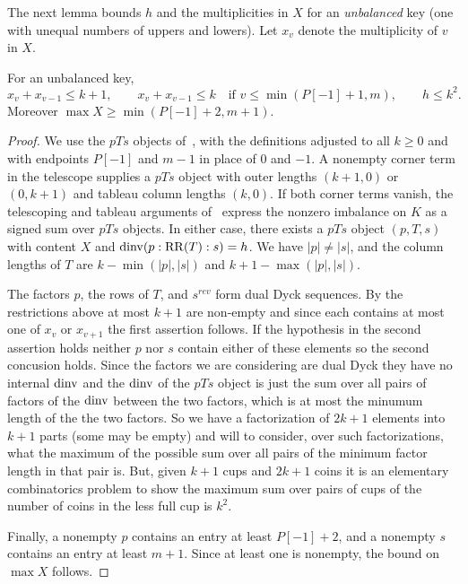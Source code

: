 \documentclass[11pt]{article}
\begin{document}
The next lemma bounds $h$ and the multiplicities in $X$ for an \emph{unbalanced} key (one with unequal numbers of uppers and lowers). Let $x_v$ denote the multiplicity of $v$ in $X$.
\begin{lemma}\label{bounds}
For an unbalanced key,
\[
x_v+x_{v-1}\le k+1,\qquad
 x_v+x_{v-1}\le k\quad\text{if }v\le\min(P[-1]+1,m), \qquad   h\le k^2.
\]
Moreover $\max X\ge\min(P[-1]+2,m+1)$.
\end{lemma}
\begin{proof}
We use the $pTs$ objects of~\cite[\S3.3]{H}, with the definitions adjusted to all $k\ge0$ and with endpoints $P[-1]$ and $m-1$ in place of $0$ and $-1$. A nonempty corner term in the telescope supplies a $pTs$ object with outer lengths $(k+1,0)$ or $(0,k+1)$ and tableau column lengths $(k,0)$. If both corner terms vanish, the telescoping and tableau arguments of~\cite[\S3.2, Lemma~3.4, and Corollary~3.5]{H} express the nonzero imbalance on $K$ as a signed sum over $pTs$ objects. In either case, there exists a $pTs$ object $(p,T,s)$ with content $X$ and $\operatorname{dinv}(p:\mathrm{RR}(T):s)=h$. We have $|p|\ne|s|$, and the column lengths of $T$ are $k-\min(|p|,|s|)$ and $k+1-\max(|p|,|s|)$.

The factors $p$, the rows of $T$, and $s^{rev}$ form dual Dyck sequences.  By the restrictions above at most $k+1$ are non-empty and since each contains at most one of $x_v$ or $x_{v+1}$ the first assertion follows. If the hypothesis in the second assertion holds neither $p$ nor $s$ contain either of these elements so the second concusion holds. Since the factors we are considering are dual Dyck they have no internal $\operatorname{dinv}$ and the $\operatorname{dinv}$ of the $pTs$ object is just the sum over all pairs of factors of the $\operatorname{dinv}$ between the two factors, which is at most the minumum length of the the two factors.  So we have a factorization of $2k+1$ elements into $k+1$ parts (some may be empty) and will to consider, over such factorizations, what the maximum of the possible sum over all pairs of the minimum factor length in that pair is.  But, given $k+1$ cups and $2k+1$ coins it is an elementary combinatorics problem to show the maximum sum over pairs of cups of the number of coins in the less full cup is $k^2$.  

Finally, a nonempty $p$ contains an entry at least $P[-1]+2$, and a nonempty $s$ contains an entry at least $m+1$. Since at least one is nonempty, the bound on $\max X$ follows.

\end{proof}
\end{document}

